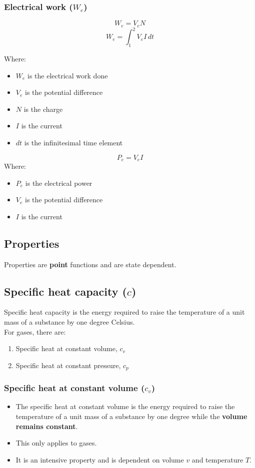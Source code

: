 \documentclass[11pt]{article}
\begin{document}
\newpage

\subsubsection{Electrical work (\(W_e\))}
\label{sec:org24d0692}
\[W_e = V_e N\]
\[W_e = \int_1^2 V_e I \, dt\]

Where:
\begin{itemize}
\item \(W_e\) is the electrical work done
\item \(V_e\) is the potential difference
\item \(N\) is the charge
\item \(I\) is the current
\item \(dt\) is the infinitesimal time element
\end{itemize}

\[P_e = V_e I\]
Where:
\begin{itemize}
\item \(P_e\) is the electrical power
\item \(V_e\) is the potential difference
\item \(I\) is the current
\end{itemize}

\subsection{Properties}
\label{sec:org5092aca}
Properties are \textbf{point} functions and are state dependent.

\subsection{Specific heat capacity (\(c\))}
\label{sec:orgb963d30}
Specific heat capacity is the energy required to raise the temperature of a unit mass of a substance by one degree Celsius.
\\[0pt]

For gases, there are:
\begin{enumerate}
\item Specific heat at constant volume, \(c_v\)
\item Specific heat at constant pressure, \(c_p\)
\end{enumerate}

\newpage

\subsubsection{Specific heat at constant volume (\(c_v\))}
\label{sec:org93e2821}
\begin{itemize}
\item The specific heat at constant volume is the energy required to raise the temperature of a unit mass of a substance by one degree while the \textbf{volume remains constant}.
\item This only applies to gases.
\item It is an intensive property and is dependent on volume \(v\) and temperature \(T\).
\end{itemize}
\end{document}
